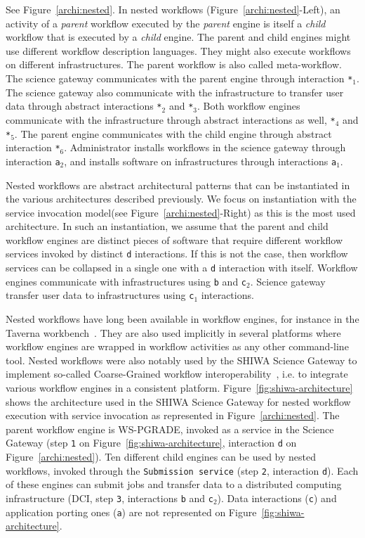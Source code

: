 \documentclass[preprint,3p,twocolumn]{elsarticle}
\begin{document}
See Figure~\ref{archi:nested}. In nested workflows (Figure~\ref{archi:nested}-Left), an activity of a
\emph{parent} workflow executed by the \emph{parent} engine is itself
a \emph{child} workflow that is executed by a \emph{child} engine. The
parent and child engines might use different workflow description
languages. They might also execute workflows on different
infrastructures. The parent workflow is also called meta-workflow. The
science gateway communicates with the parent engine through
interaction \texttt{*$_1$}. The science gateway also communicate with
the infrastructure to transfer user data through abstract interactions
\texttt{*$_2$} and \texttt{*$_3$}. Both workflow engines communicate
with the infrastructure through abstract interactions as well,
\texttt{*$_4$} and \texttt{*$_5$}. The parent engine communicates with
the child engine through abstract interaction
\texttt{*$_6$}. Administrator installs workflows in the science
gateway through interaction \texttt{a$_2$}, and installs software on
infrastructures through interactions \texttt{a$_1$}.

Nested workflows are abstract architectural patterns that can be
instantiated in the various architectures described previously. We
focus on instantiation with the service invocation model(see
Figure~\ref{archi:nested}-Right) as this is the most used
architecture. In such an instantiation, we assume that the parent and
child workflow engines are distinct pieces of software that require
different workflow services invoked by distinct \texttt{d}
interactions. If this is not the case, then workflow services can be
collapsed in a single one with a \texttt{d} interaction with
itself. Workflow engines communicate with infrastructures using
\texttt{b} and \texttt{c$_2$}. Science gateway transfer user data to
infrastructures using \texttt{c$_1$} interactions.


Nested workflows have long been available in workflow engines, for
instance in the Taverna workbench~\cite{oinn2004taverna}. They are
also used implicitly in several platforms where workflow engines are
wrapped in workflow activities as any other command-line tool. Nested
workflows were also notably used by the SHIWA Science Gateway to
implement so-called Coarse-Grained workflow
interoperability~\cite{terstyanszky2014enabling}, i.e. to integrate
various workflow engines in a consistent
platform. Figure~\ref{fig:shiwa-architecture} shows the architecture
used in the SHIWA Science Gateway for nested workflow execution with
service invocation as represented in Figure~\ref{archi:nested}. The
parent workflow engine is WS-PGRADE, invoked as a service in the
Science Gateway (step \texttt{1} on
Figure~\ref{fig:shiwa-architecture}, interaction \texttt{d} on
Figure~\ref{archi:nested}). Ten different child engines can be used by
nested workflows, invoked through the \texttt{Submission service}
(step \texttt{2}, interaction \texttt{d}). Each of these engines can
submit jobs and transfer data to a distributed computing
infrastructure (DCI, step \texttt{3}, interactions \texttt{b} and
\texttt{c$_2$}). Data interactions (\texttt{c}) and application
porting ones (\texttt{a}) are not represented on
Figure~\ref{fig:shiwa-architecture}.
\end{document}
